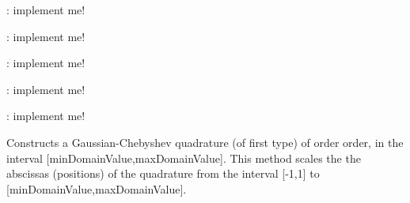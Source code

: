 \begin{DoxyRefList}
\item[\label{todo__todo000047}%
\hypertarget{todo__todo000047}{}%
Member \hyperlink{class_q_u_e_s_o_1_1_statistical_forward_problem_a023244862152f4398c4544e9239fe32a}{Q\-U\-E\-S\-O\-:\-:Statistical\-Forward\-Problem$<$ P\-\_\-\-V, P\-\_\-\-M, Q\-\_\-\-V, Q\-\_\-\-M $>$\-:\-:print} (std\-::ostream \&os) const ]\-: implement me!  
\item[\label{todo__todo000049}%
\hypertarget{todo__todo000049}{}%
Member \hyperlink{class_q_u_e_s_o_1_1_statistical_inverse_problem_a1f5e10175b41d273d86e54c61cf44839}{Q\-U\-E\-S\-O\-:\-:Statistical\-Inverse\-Problem$<$ P\-\_\-\-V, P\-\_\-\-M $>$\-:\-:print} (std\-::ostream \&os) const ]\-: implement me!  
\item[\label{todo__todo000051}%
\hypertarget{todo__todo000051}{}%
Member \hyperlink{class_q_u_e_s_o_1_1_uniform_vector_r_v_ab6dee885e568635b7b7e9675b4e66833}{Q\-U\-E\-S\-O\-:\-:Uniform\-Vector\-R\-V$<$ V, M $>$\-:\-:print} (std\-::ostream \&os) const ]\-: implement me!  
\item[\label{todo__todo000053}%
\hypertarget{todo__todo000053}{}%
Member \hyperlink{class_q_u_e_s_o_1_1_vector_gaussian_random_field_a5c0963ff4c87895a69b941059b3f9afd}{Q\-U\-E\-S\-O\-:\-:Vector\-Gaussian\-Random\-Field$<$ P\-\_\-\-V, P\-\_\-\-M, Q\-\_\-\-V, Q\-\_\-\-M $>$\-:\-:operator=} (const Vector\-Gaussian\-Random\-Field \&rhs)]\-: implement me!  
\item[\label{todo__todo000052}%
\hypertarget{todo__todo000052}{}%
Member \hyperlink{class_q_u_e_s_o_1_1_vector_gaussian_random_field_adb2728a7cb86783378103b82c4926eb5}{Q\-U\-E\-S\-O\-:\-:Vector\-Gaussian\-Random\-Field$<$ P\-\_\-\-V, P\-\_\-\-M, Q\-\_\-\-V, Q\-\_\-\-M $>$\-:\-:Vector\-Gaussian\-Random\-Field} (const Vector\-Gaussian\-Random\-Field \&obj)]\-: implement me!  
\item[\label{todo__todo000011}%
\hypertarget{todo__todo000011}{}%
Member \hyperlink{class_q_u_e_s_o_1_1_wigner_inverse_chebyshev1st1_d_quadrature_a8a40172427db7b72e0885c30f745ad13}{Q\-U\-E\-S\-O\-:\-:Wigner\-Inverse\-Chebyshev1st1\-D\-Quadrature\-:\-:Wigner\-Inverse\-Chebyshev1st1\-D\-Quadrature} (double min\-Domain\-Value, double max\-Domain\-Value, unsigned int order)]Constructs a Gaussian-\/\-Chebyshev quadrature (of first type) of order {\ttfamily order}, in the interval {\ttfamily \mbox{[}min\-Domain\-Value,max\-Domain\-Value\mbox{]}}. This method scales the the abscissas (positions) of the quadrature from the interval \mbox{[}-\/1,1\mbox{]} to {\ttfamily \mbox{[}min\-Domain\-Value,max\-Domain\-Value\mbox{]}}.  

\end{DoxyRefList}
